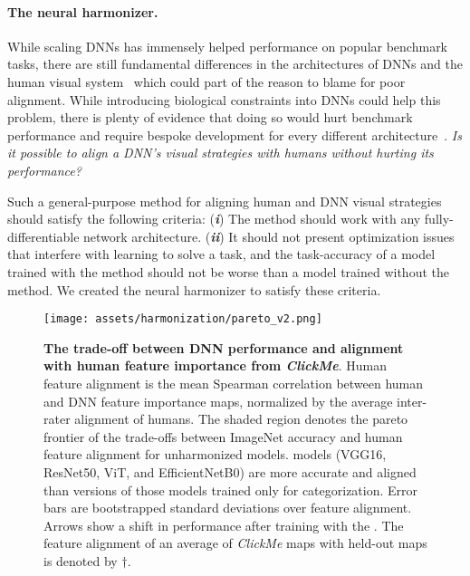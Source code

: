 \paragraph{The neural harmonizer.} While scaling DNNs has immensely helped performance on popular benchmark tasks, there are still fundamental differences in the architectures of DNNs and the human visual system~\cite{Serre2019-bb} which could part of the reason to blame for poor alignment. While introducing biological constraints into DNNs could help this problem, there is plenty of evidence that doing so would hurt benchmark performance and require bespoke development for every different architecture~\cite{Tang2018-vg,Kubilius2019-qr,Schrimpf2020-em}. \textit{Is it possible to align a DNN's visual strategies with humans without hurting its performance?}

Such a general-purpose method for aligning human and DNN visual strategies should satisfy the following criteria: (\textbf{\textit{i}}) The method should work with any fully-differentiable network architecture. (\textbf{\textit{ii}}) It should not present optimization issues that interfere with learning to solve a task, and the task-accuracy of a model trained with the method should not be worse than a model trained without the method. We created the neural harmonizer to satisfy these criteria.

\begin{figure}[ht!]
\begin{center}
   \texttt{[image: assets/harmonization/pareto\_v2.png]}
\end{center}
   \caption{\textbf{The trade-off between DNN performance and alignment with human feature importance from \textit{ClickMe}\cite{Linsley2019-ew}}. Human feature alignment is the mean Spearman correlation between human and DNN feature importance maps, normalized by the average inter-rater alignment of humans. The shaded region denotes the pareto frontier of the trade-offs between ImageNet accuracy and human feature alignment for unharmonized models.  {\color{meta}{Harmonized}} models (VGG16, ResNet50, ViT, and EfficientNetB0) are more accurate and aligned than versions of those models trained only for categorization. Error bars are bootstrapped standard deviations over feature alignment. Arrows show a shift in performance after training with the {\color{meta}{neural harmonizer}}. The feature alignment of an average of \textit{ClickMe} maps with held-out maps is denoted by $\dagger$.}
\label{fig:harmonization:clickme_results}
\end{figure}

